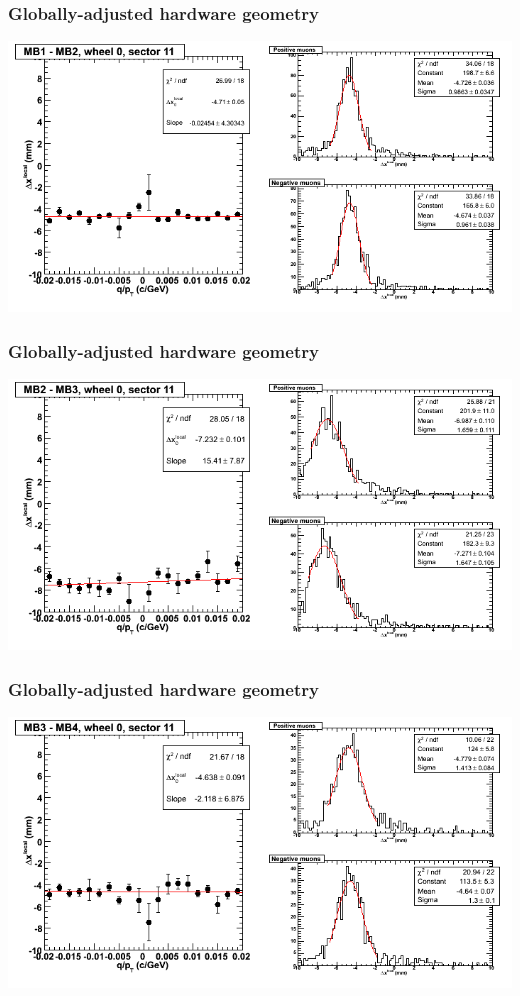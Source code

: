 \documentclass[compress]{beamer}
\begin{document}
\begin{frame}
\frametitle{Globally-adjusted hardware geometry}
\includegraphics[width=\linewidth]{NOV4_segdiffs_HW/dt13_resid_C_11_12.png}
\end{frame}

\begin{frame}
\frametitle{Globally-adjusted hardware geometry}
\includegraphics[width=\linewidth]{NOV4_segdiffs_HW/dt13_resid_C_11_23.png}
\end{frame}

\begin{frame}
\frametitle{Globally-adjusted hardware geometry}
\includegraphics[width=\linewidth]{NOV4_segdiffs_HW/dt13_resid_C_11_34.png}
\end{frame}
\end{document}
